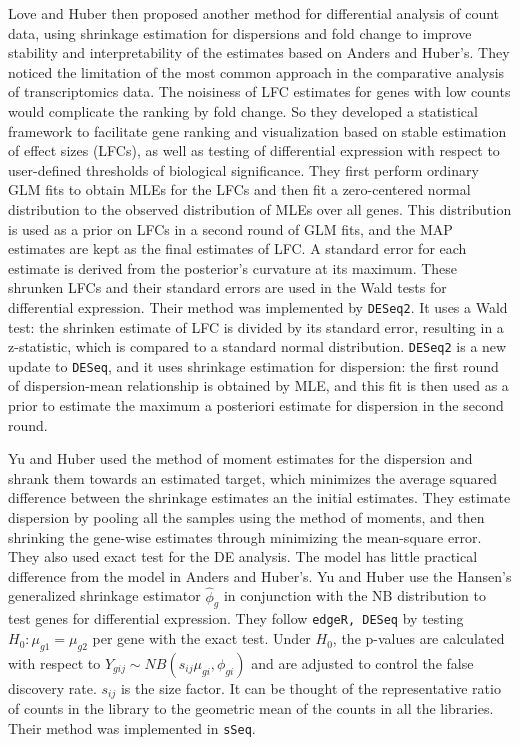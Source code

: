Love and Huber \citep{love2014moderated} then proposed another method for differential analysis of count data, using shrinkage estimation for dispersions and fold change to improve stability and interpretability of the estimates based on Anders and Huber's. They noticed the limitation of the most common approach in the comparative analysis of transcriptomics data. The noisiness of LFC estimates for genes with low counts would complicate the ranking by fold change. So they developed a statistical framework to facilitate gene ranking and visualization based on stable estimation of effect sizes (LFCs), as well as testing of differential expression with respect to user-defined thresholds of biological significance. They first perform ordinary GLM fits to obtain MLEs for the LFCs and then fit a zero-centered normal distribution to the observed distribution of MLEs over all genes. This distribution is used as a prior on LFCs in a second round of GLM fits, and the MAP estimates are kept as the final estimates of LFC. A standard error for each estimate is derived from the posterior's curvature at its maximum. These shrunken LFCs and their standard errors are used in the Wald tests for differential expression. Their method was implemented by {\tt DESeq2}. It uses a Wald test: the shrinken estimate of LFC is divided by its standard error, resulting in a z-statistic, which is compared to a standard normal distribution. {\tt DESeq2} is a new update to {\tt DESeq}, and it uses shrinkage estimation for dispersion: the first round of dispersion-mean relationship is obtained by MLE, and this fit is then used as a prior to estimate the maximum a posteriori estimate for dispersion in the second round. 


Yu and Huber used the method of moment estimates for the dispersion and shrank them towards an estimated target, which minimizes the average squared difference between the shrinkage estimates an the initial estimates. They estimate dispersion by pooling all the samples using the method of moments, and then shrinking the gene-wise estimates through minimizing the mean-square error. They also used exact test for the DE analysis. The model has little practical difference from the model in Anders and Huber's. Yu and Huber use the Hansen's generalized shrinkage estimator $\hat{\phi}_g$ in conjunction with the NB distribution to test genes for differential expression. They follow {\tt edgeR, DESeq} by testing $H_{0}: \mu_{g1} = \mu_{g2}$ per gene with the exact test. Under $H_{0}$, the p-values are calculated with respect to $Y_{gij} {\sim} NB(s_{ij}\mu_{gi}, \phi_{gi})$ and are adjusted to control the false discovery rate\citep{yu2013sseq}. $s_{ij}$ is the size factor. It can be thought of the representative ratio of counts in the library to the geometric mean of the counts in all the libraries. Their method was implemented in {\tt sSeq}.


